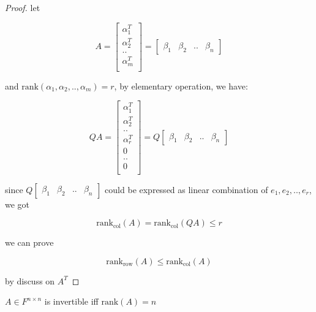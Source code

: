 \begin{proof}
   let 
   
   \[
    A = \begin{bmatrix}
        \alpha_1^T \\
        \alpha_2^T \\
        .. \\
        \alpha_m^T \\
    \end{bmatrix} = \begin{bmatrix}
        \beta_1 & \beta_2 & .. & \beta_n
    \end{bmatrix}
   \]

   and $\mathrm{rank}(\alpha_1, \alpha_2, .., \alpha_m) = r$, by elementary operation, we have:

   \[
    QA = \begin{bmatrix}
        \alpha_1^T \\
        \alpha_2^T \\
        .. \\
        \alpha_r^T \\
        0 \\
        .. \\
        0 \\
    \end{bmatrix} = Q\begin{bmatrix}
        \beta_1 & \beta_2 & .. & \beta_n
    \end{bmatrix}
   \]

   since $Q\begin{bmatrix}
        \beta_1 & \beta_2 & .. & \beta_n
    \end{bmatrix}$ could be expressed as linear combination of $e_1,e_2,..,e_r$, we got

    \[
        \mathrm{rank}_{\mathrm{col}}(A) = \mathrm{rank}_{\mathrm{col}}(QA) \le r
    \]

    we can prove 


    \[
        \mathrm{rank}_{\mathrm{row}}(A) \le \mathrm{rank}_{\mathrm{col}}(A)
    \]

    by discuss on $A^T$
\end{proof}

\begin{exercise}
   $A \in F^{n \times n}$ is invertible iff $\mathrm{rank}(A) = n$
\end{exercise}

